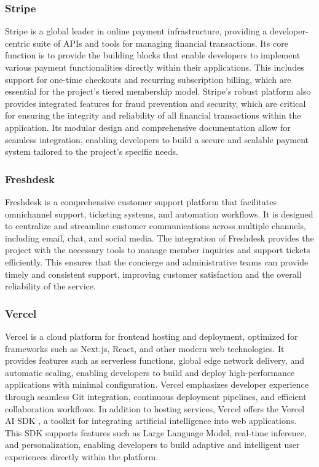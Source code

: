 \subsubsection{Stripe}
\label{sec:stripe}
Stripe \cite{stripe2025homepage} is a global leader in online payment infrastructure, providing a developer-centric suite of APIs and tools for managing financial transactions. Its core function is to provide the building blocks that enable developers to implement various payment functionalities directly within their applications. This includes support for one-time checkouts and recurring subscription billing, which are essential for the project's tiered membership model. Stripe's robust platform also provides integrated features for fraud prevention and security, which are critical for ensuring the integrity and reliability of all financial transactions within the application. Its modular design and comprehensive documentation allow for seamless integration, enabling developers to build a secure and scalable payment system tailored to the project's specific needs.

\newpage
\subsubsection{Freshdesk}
Freshdesk \cite{freshworks2025freshdesk} is a comprehensive customer support platform that facilitates omnichannel support, ticketing systems, and automation workflows. It is designed to centralize and streamline customer communications across multiple channels, including email, chat, and social media. The integration of Freshdesk provides the project with the necessary tools to manage member inquiries and support tickets efficiently. This ensures that the concierge and administrative teams can provide timely and consistent support, improving customer satisfaction and the overall reliability of the service.

\subsubsection{Vercel}
Vercel \cite{vercel2025docs} is a cloud platform for frontend hosting and deployment, optimized for frameworks such as Next.js, React, and other modern web technologies. It provides features such as serverless functions, global edge network delivery, and automatic scaling, enabling developers to build and deploy high-performance applications with minimal configuration. Vercel emphasizes developer experience through seamless Git integration, continuous deployment pipelines, and efficient collaboration workflows.
In addition to hosting services, Vercel offers the Vercel AI SDK \cite{vercel2023aisdk}, a toolkit for integrating artificial intelligence into web applications. This SDK supports features such as Large Language Model, real-time inference, and personalization, enabling developers to build adaptive and intelligent user experiences directly within the platform.

